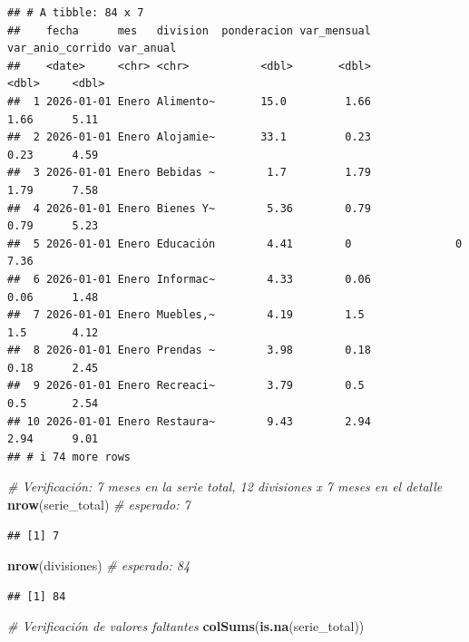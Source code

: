 \documentclass[
]{article}
\newenvironment{Shaded}{\begin{snugshade}}{\end{snugshade}}
\newcommand{\CommentTok}[1]{\textcolor[rgb]{0.56,0.35,0.01}{\textit{#1}}}
\newcommand{\FunctionTok}[1]{\textcolor[rgb]{0.13,0.29,0.53}{\textbf{#1}}}
\newcommand{\NormalTok}[1]{#1}
\begin{document}
\begin{verbatim}
## # A tibble: 84 x 7
##    fecha      mes   division  ponderacion var_mensual var_anio_corrido var_anual
##    <date>     <chr> <chr>           <dbl>       <dbl>            <dbl>     <dbl>
##  1 2026-01-01 Enero Alimento~       15.0         1.66             1.66      5.11
##  2 2026-01-01 Enero Alojamie~       33.1         0.23             0.23      4.59
##  3 2026-01-01 Enero Bebidas ~        1.7         1.79             1.79      7.58
##  4 2026-01-01 Enero Bienes Y~        5.36        0.79             0.79      5.23
##  5 2026-01-01 Enero Educación        4.41        0                0         7.36
##  6 2026-01-01 Enero Informac~        4.33        0.06             0.06      1.48
##  7 2026-01-01 Enero Muebles,~        4.19        1.5              1.5       4.12
##  8 2026-01-01 Enero Prendas ~        3.98        0.18             0.18      2.45
##  9 2026-01-01 Enero Recreaci~        3.79        0.5              0.5       2.54
## 10 2026-01-01 Enero Restaura~        9.43        2.94             2.94      9.01
## # i 74 more rows
\end{verbatim}

\begin{Shaded}
\begin{Highlighting}[]
\CommentTok{\# Verificación: 7 meses en la serie total, 12 divisiones x 7 meses en el detalle}
\FunctionTok{nrow}\NormalTok{(serie\_total)   }\CommentTok{\# esperado: 7}
\end{Highlighting}
\end{Shaded}

\begin{verbatim}
## [1] 7
\end{verbatim}

\begin{Shaded}
\begin{Highlighting}[]
\FunctionTok{nrow}\NormalTok{(divisiones)    }\CommentTok{\# esperado: 84}
\end{Highlighting}
\end{Shaded}

\begin{verbatim}
## [1] 84
\end{verbatim}

\begin{Shaded}
\begin{Highlighting}[]
\CommentTok{\# Verificación de valores faltantes}
\FunctionTok{colSums}\NormalTok{(}\FunctionTok{is.na}\NormalTok{(serie\_total))}
\end{Highlighting}
\end{Shaded}
\end{document}
